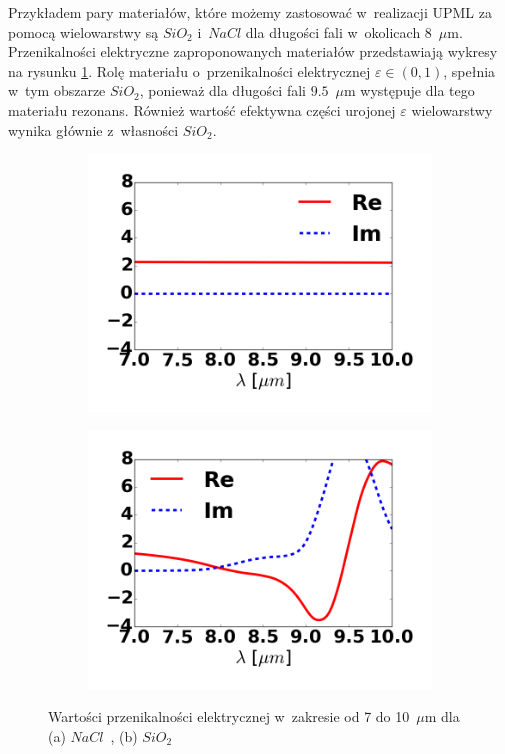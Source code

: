Przykładem pary materiałów, które możemy zastosować w~realizacji UPML za pomocą wielowarstwy są $SiO_2$ i~$NaCl$ dla długości fali w~okolicach 8~$\mu$m. Przenikalności elektryczne zaproponowanych materiałów przedstawiają wykresy na rysunku \ref{fig:nacl-sio2-mat}. Rolę materiału o~przenikalności elektrycznej $\varepsilon \in (0,1)$, spełnia w~tym obszarze $SiO_2$, ponieważ dla długości fali $9.5$~$\mu$m występuje dla tego materiału rezonans. Również wartość efektywna części urojonej $\varepsilon$ wielowarstwy wynika głównie z~własności $SiO_2$. 

\begin{figure}[tb]
	\begin{subfigure}{0.45\textwidth}
		\includegraphics[width=\textwidth]{images/pml/nacl.png}
		\caption{}
	\end{subfigure}
	\begin{subfigure}{0.45\textwidth}
		\includegraphics[width=\textwidth]{images/pml/sio2.png}	
		\caption{}
	\end{subfigure}
	\caption{Wartości przenikalności elektrycznej w~zakresie od 7 do 10~$\mu$m dla (a) $NaCl$~\cite{li1976refractive}, (b) $SiO_2$~\cite{Kischkat:12}}
	\label{fig:nacl-sio2-mat}
\end{figure}


